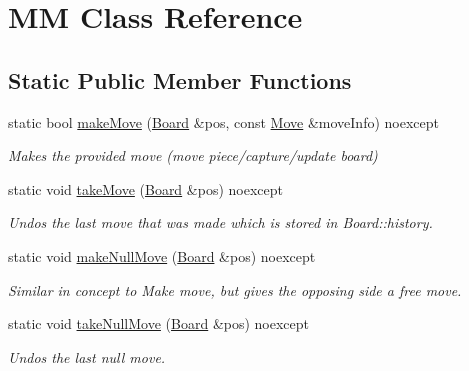\hypertarget{classMM}{}\section{MM Class Reference}
\label{classMM}
\subsection*{Static Public Member Functions}
\begin{DoxyCompactItemize}
\item 
static bool \mbox{\hyperlink{classMM_ad56f88355a078f3b14b290fe153966b4}{make\+Move}} (\mbox{\hyperlink{classBoard}{Board}} \&pos, const \mbox{\hyperlink{classMove}{Move}} \&move\+Info) noexcept
\begin{DoxyCompactList}\small\item\em Makes the provided move (move piece/capture/update board) \end{DoxyCompactList}\item 
static void \mbox{\hyperlink{classMM_aaf252571e1f48cae22b2093bf55058b5}{take\+Move}} (\mbox{\hyperlink{classBoard}{Board}} \&pos) noexcept
\begin{DoxyCompactList}\small\item\em Undos the last move that was made which is stored in Board\+::history. \end{DoxyCompactList}\item 
static void \mbox{\hyperlink{classMM_a363e843e6bebaf747bf9482c963ed6b9}{make\+Null\+Move}} (\mbox{\hyperlink{classBoard}{Board}} \&pos) noexcept
\begin{DoxyCompactList}\small\item\em Similar in concept to Make move, but gives the opposing side a free move. \end{DoxyCompactList}\item 
static void \mbox{\hyperlink{classMM_aabe809e8405f8ea0666a7d6e25aedac5}{take\+Null\+Move}} (\mbox{\hyperlink{classBoard}{Board}} \&pos) noexcept
\begin{DoxyCompactList}\small\item\em Undos the last null move. \end{DoxyCompactList}\end{DoxyCompactItemize}
